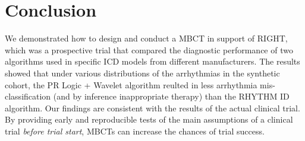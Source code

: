 \section{Conclusion}
\label{sec:conclusion}
We demonstrated how to design and conduct a \acl{MBCT} in support of RIGHT, which was a prospective trial that compared the diagnostic performance of two algorithms used in specific \ac{ICD} models from different manufacturers.
The results showed that under various distributions of the arrhythmias in the synthetic cohort, the PR Logic + Wavelet algorithm reulted in less arrhythmia mis-classification (and by inference inappropriate therapy) than the RHYTHM ID algorithm. 
Our findings are consistent with the results of the actual clinical trial.
By providing early and reproducible tests of the main assumptions of a clinical trial \emph{before trial start}, \acp{MBCT} can increase the chances of trial success.
